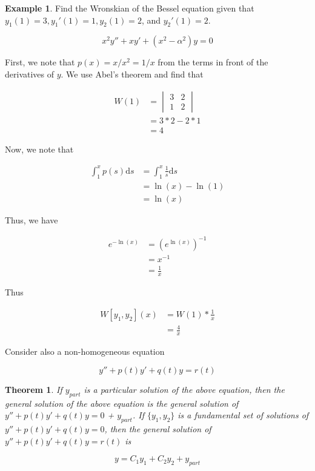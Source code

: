 \documentclass[11pt]{article}
\theoremstyle{plain} %
\newtheorem*{theorem}{Theorem}
\theoremstyle{definition}
\theoremstyle{example}
\newtheorem*{example}{Example}
\theoremstyle{remark}
\begin{document}
\begin{example}
Find the Wronskian of the Bessel equation given that $y_1(1) = 3, y_1'(1)=1, y_2(1)=2$, and $y_2'(1) = 2$.

$$x^2y'' + xy' + \left(x^2 -\alpha^2\right)y = 0$$
\end{example}

First, we note that $p(x) = x/x^2 = 1/x$ from the terms in front of the derivatives of $y$. We use Abel's theorem and find that 

\begin{align*}
W(1) &= \begin{vmatrix}
3 & 2 \\
1 & 2
\end{vmatrix}\\
&= 3*2-2*1\\
&= 4
\end{align*}

Now, we note that 

\begin{align*}
\int_1^x p(s) \mathrm d s &= \int_1^x \frac{1}{s}\mathrm d s\\
&= \ln(x) -\ln(1)\\
&= \ln(x)
\end{align*}

Thus, we have 

\begin{align*}
e^{-\ln(x)} &= \left(e^{\ln(x)}\right)^{-1}\\
&= x^{-1}\\
&= \frac{1}{x}
\end{align*}

Thus

\begin{align*}
W[y_1, y_2](x) &= W(1)*\frac{1}{x}\\
&= \frac{4}{x}
\end{align*}

Consider also a non-homogeneous equation 

$$y'' + p(t)y' + q(t)y = r(t)$$

\begin{theorem}
If $y_{part}$ is a particular solution of the above equation, then the general solution of the above equation is the general solution of $y'' + p(t)y' + q(t)y = 0$ + $y_{part}$. If $\{y_1, y_2\}$ is a fundamental set of solutions of $y'' + p(t)y' + q(t)y = 0$, then the general solution of $y'' + p(t)y' + q(t)y = r(t)$ is

$$y = C_1y_1 + C_2y_2 + y_{part}$$
\end{theorem}
\end{document}
